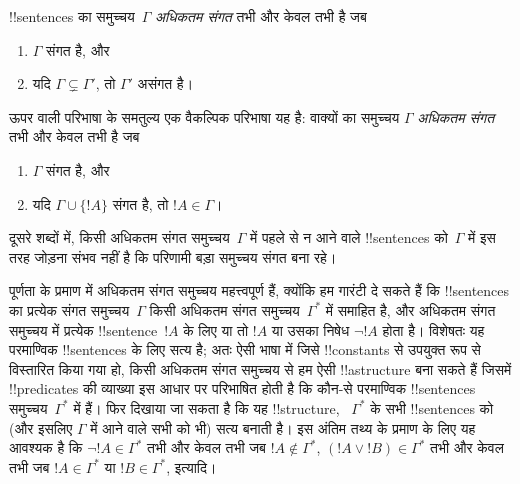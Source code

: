 \documentclass[../../../include/open-logic-section]{subfiles}
\begin{document}

\begin{defn}[अधिकतम संगत समुच्चय]
!!{sentence}s का समुच्चय~$\Gamma$ \emph{अधिकतम संगत} तभी और केवल तभी है जब
\begin{enumerate}
\item $\Gamma$ संगत है, और
\item यदि $\Gamma \subsetneq \Gamma'$, तो $\Gamma'$ असंगत है।
\end{enumerate}
\end{defn}

\begin{explain}
ऊपर वाली परिभाषा के समतुल्य एक वैकल्पिक परिभाषा यह है: वाक्यों का समुच्चय
$\Gamma$ \emph{अधिकतम संगत} तभी और केवल तभी है जब
\begin{enumerate}
\item $\Gamma$ संगत है, और
\item यदि $\Gamma \cup \{ !A \}$ संगत है, तो $!A \in \Gamma$।
\end{enumerate}
दूसरे शब्दों में, किसी अधिकतम संगत समुच्चय~$\Gamma$ में पहले से न आने वाले
!!{sentence}s को~$\Gamma$ में इस तरह जोड़ना संभव नहीं है कि परिणामी
बड़ा समुच्चय संगत बना रहे।
\end{explain}

\begin{explain}
पूर्णता के प्रमाण में अधिकतम संगत समुच्चय महत्त्वपूर्ण हैं, क्योंकि हम
गारंटी दे सकते हैं कि !!{sentence}s का प्रत्येक संगत समुच्चय~$\Gamma$ किसी
अधिकतम संगत समुच्चय~$\Gamma^*$ में समाहित है, और अधिकतम संगत समुच्चय में
प्रत्येक !!{sentence}~$!A$ के लिए या तो $!A$ या उसका निषेध $\lnot !A$ होता
है। विशेषतः यह परमाण्विक !!{sentence}s के लिए सत्य है; अतः ऐसी भाषा में
जिसे !!{constant}s से उपयुक्त रूप से विस्तारित किया गया हो, किसी अधिकतम
संगत समुच्चय से हम ऐसी !!a{structure} बना सकते हैं जिसमें !!{predicate}s
की व्याख्या इस आधार पर परिभाषित होती है कि कौन-से परमाण्विक !!{sentence}s
समुच्चय~$\Gamma^*$ में हैं। फिर दिखाया जा सकता है कि यह !!{structure},
~$\Gamma^*$ के सभी !!{sentence}s को (और इसलिए $\Gamma$ में आने वाले सभी को
भी) सत्य बनाती है। इस अंतिम तथ्य के प्रमाण के लिए यह आवश्यक है कि
$\lnot !A \in
\Gamma^*$ तभी और केवल तभी जब $!A \notin \Gamma^*$, $(!A \lor !B) \in \Gamma^*$
तभी और केवल तभी जब $!A
\in \Gamma^*$ या $!B \in \Gamma^*$, इत्यादि।
\end{explain}
\end{document}
